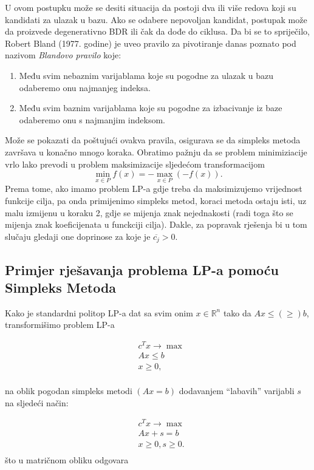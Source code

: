 \documentclass[a4paper, utf8, 11pt, colorlinks]{article}
\begin{document}
U ovom postupku  može se desiti situacija da postoji dva ili više redova koji su kandidati za ulazak u bazu. Ako se odabere nepovoljan kandidat, postupak može da proizvede degenerativno BDR ili čak da dođe do ciklusa. 
Da bi se to spriječilo, Robert Bland (1977. godine) je uveo pravilo za pivotiranje danas poznato pod
nazivom \emph{Blandovo pravilo} koje:
\begin{enumerate}
	\item   Među svim nebaznim varijablama koje su pogodne za ulazak u bazu odaberemo onu najmanjeg indeksa. 
    \item Među svim baznim varijablama koje su pogodne za izbacivanje iz baze odaberemo onu s najmanjim indeksom.
\end{enumerate}
Može se pokazati da poštujući ovakva pravila, osigurava se da simpleks metoda  završava u konačno mnogo koraka.
Obratimo pažnju da se problem minimiziacije vrlo lako prevodi u problem maksimizacije sljedećom transformacijom
$$ \min_{ x \in P} f(x) = - \max_{x \in P}(-f(x)).$$ 
Prema tome, ako imamo problem LP-a gdje treba da maksimizujemo vrijednost funkcije cilja, pa onda primijenimo simpleks metod, koraci metoda ostaju isti, uz malu izmijenu u koraku 2, gdje se mijenja znak nejednakosti (radi toga što se mijenja znak koeficijenata u funckciji cilja). Dakle, za popravak rješenja bi u tom slučaju gledaji one doprinose za koje je $\overline{c_j} > 0$.

\subsection{Primjer rješavanja problema LP-a pomoću Simpleks Metoda}
Kako je standardni politop LP-a dat sa svim onim $x \in \mathbb{R}^n$ tako da $Ax \leq (\geq) b$, transformišimo problem LP-a
 
  \begin{align}
    & c^T x \rightarrow \max \\
    & Ax \leq b \\
    & x \geq 0,\\
\end{align}
 
na oblik pogodan simpleks metodi $(A {x} = b)$ dodavanjem ``labavih'' varijabli $s$ na sljedeći način:
 
\begin{align}
    & c^T x \rightarrow \max \\
    & Ax + s =  b \\
    & x \geq 0, s \geq 0. \\
\end{align}
što u matričnom obliku odgovara 
\end{document}
